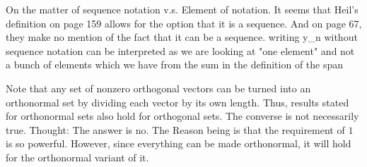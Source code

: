 



On the matter of sequence notation v.s. Element of notation. It seems that Heil's definition on page 159 allows for the option that it is a sequence. And on page 67, they make no mention of the fact that it can be a sequence.
writing y_n without sequence notation can be interpreted as we are looking at "one element" and not a bunch of elements which we have from the sum in the definition of the span


Note that any set of nonzero orthogonal vectors can be turned into an orthonormal set by dividing each vector by its own length. 
Thus, results stated for orthonormal sets also hold for orthogonal sets. The converse is not necessarily true.
Thought: The answer is no. The Reason being is that the requirement of $1$ is so powerful. However, since everything can be made orthonormal, it will hold for the orthonormal variant of it. 




